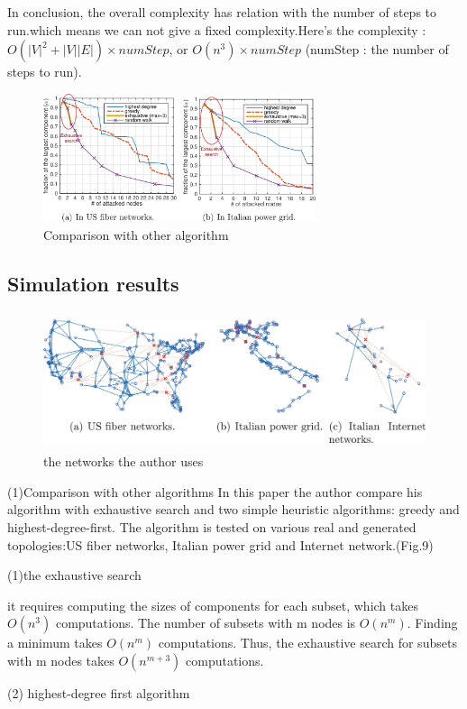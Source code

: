 \documentclass[10pt,journal]{IEEEtran}
\begin{document}
In conclusion, the overall complexity has relation with the number of steps to run.which means we can not give a fixed complexity.Here's the complexity : $O( |V|^2 + |V||E| )\times numStep$, or $O(n^3)\times numStep$ (numStep : the number of steps to run).


\begin{figure}[htbp]
	\centering
	\includegraphics[width=8cm]{img/compresult}
	\caption[]{Comparison with other algorithm}
\end{figure}
\subsection{Simulation results}
\begin{figure}[htbp]
	\centering 
	\includegraphics[height=4cm,width=13cm]{img/networks}
	\caption{the networks the author uses }
\end{figure}



(1)Comparison with other algorithms
In this paper the author compare his algorithm with exhaustive search and two simple heuristic algorithms: greedy and highest-degree-first.
The algorithm is tested on various real and generated topologies:US fiber networks, Italian power grid and Internet network.(Fig.9)

(1)the exhaustive search

it requires computing the sizes of components for each subset, which takes $O(n^3)$
computations. The number of subsets with m nodes is $O(n^m)$. Finding a
minimum takes $O(n^m)$ computations. Thus, the exhaustive search for
subsets with m nodes takes $O(n^{m+3})$ computations. 

(2) highest-degree first algorithm 
\end{document}
